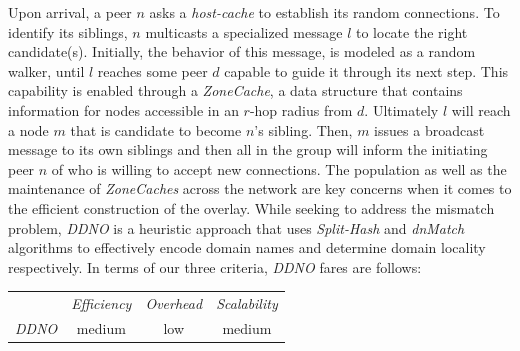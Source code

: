Upon arrival, a peer $n$ asks a \emph{host-cache} to establish its
random connections. 
To identify its siblings, $n$ multicasts a specialized message $l$ 
to locate the right candidate(s).
Initially, the behavior of this message, is modeled as a random walker,
until $l$ reaches some peer $d$ capable to guide it through its next step.
This capability is enabled through a \emph{ZoneCache}, a data structure that
contains information for nodes accessible in an $r$-hop radius from $d$.
Ultimately $l$ will reach a node $m$ that is candidate to become $n$'s sibling. 
Then, $m$ issues a broadcast message to its own siblings and then all in the group will
inform the initiating peer $n$ of who is willing to accept new connections.
The population as well as the maintenance of \emph{ZoneCaches} across the network
are key concerns when it comes to the efficient construction of the overlay.
While seeking to address the mismatch problem, 
\emph{DDNO} is a heuristic approach that uses
\emph{Split-Hash} and \emph{dnMatch} algorithms to effectively encode domain
names and determine domain locality respectively. 
In terms of our three criteria, \emph{DDNO} fares are follows:
\begin{center}
{\footnotesize
\begin{tabular}{rccc}
\multicolumn{1}{r}{} &
\multicolumn{1}{c}{\emph{Efficiency}} &
\multicolumn{1}{c}{\emph{Overhead}} &
\multicolumn{1}{c}{\emph{Scalability}}
\\
\cline{2-4}
\emph{DDNO} &
medium &
low &
medium
\end{tabular}
}
\end{center}

